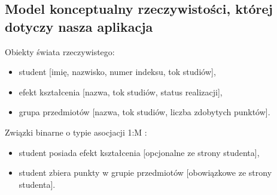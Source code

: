 \documentclass{article}
\begin{document}
\subsection{Model konceptualny rzeczywistości, której dotyczy nasza aplikacja}
Obiekty świata rzeczywistego:
\begin{itemize}
 \item student [imię, nazwisko, numer indeksu, tok studiów],
 \item efekt kształcenia [nazwa, tok studiów, status realizacji],
 \item grupa przedmiotów [nazwa, tok studiów, liczba zdobytych punktów].
\end{itemize}
Związki binarne o typie asocjacji 1:M :
\begin{itemize}
 \item student posiada efekt kształcenia [opcjonalne ze strony studenta],
 \item student zbiera punkty w grupie przedmiotów [obowiązkowe ze strony studenta].
\end{itemize}
\end{document}
